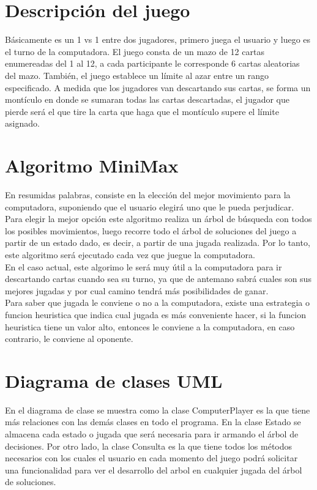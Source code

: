 \documentclass[12pt,a4paper]{article}
\begin{document}
\section{Descripción del juego}
Básicamente es un 1 vs 1 entre dos jugadores, primero juega el usuario y luego es el turno de la computadora. El juego consta de  un mazo de 12 cartas enumereadas del 1 al 12, a cada participante le corresponde 6 cartas aleatorias del mazo. También, el juego establece un límite al azar entre un rango especificado. A medida que los jugadores van descartando sus cartas, se forma un montículo en donde se sumaran todas las cartas descartadas, el jugador que pierde será el que tire la carta que haga que el montículo supere el límite asignado.  

\section{Algoritmo MiniMax}
En resumidas palabras, consiste en la elección del mejor movimiento para la computadora, suponiendo que el usuario elegirá uno que le pueda perjudicar. Para elegir la mejor opción este algoritmo realiza un árbol de búsqueda con todos los posibles movimientos, luego recorre todo el árbol de soluciones del juego a partir de un estado dado, es decir, a partir de una jugada realizada. Por lo tanto, este algoritmo será ejecutado cada vez que juegue la computadora.\\

En el caso actual, este algorimo le será muy útil a la computadora para ir descartando cartas cuando sea su turno, ya que de antemano sabrá cuales son sus mejores jugadas y por cual camino tendrá más posibilidades de ganar.\\

Para saber que jugada le conviene o no a la computadora, existe una estrategia o funcion heuristica que indica cual jugada es más conveniente hacer, si la funcion heuristica tiene un valor alto, entonces le conviene a la computadora, en caso contrario, le conviene al oponente.

\section{Diagrama de clases UML}
En el diagrama de clase se muestra como la clase ComputerPlayer es la que tiene más relaciones con las demás clases en todo el programa. En la clase Estado se almacena cada estado o jugada que será necesaria para ir armando el árbol de decisiones.
Por otro lado, la clase Consulta es la que tiene todos los métodos necesarios con los cuales el usuario en cada momento del juego podrá solicitar una funcionalidad para ver el desarrollo del arbol en cualquier jugada del árbol de soluciones.
\end{document}
